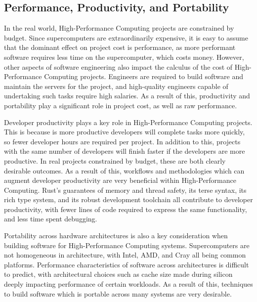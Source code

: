\subsection{Performance, Productivity, and Portability}
\label{ssec:p3hpc} %

In the real world, High-Performance Computing projects are constrained by budget. Since supercomputers are extraordinarily expensive, it is easy to assume that the dominant effect on project cost is performance, as more performant software requires less time on the supercomputer, which costs money. However, other aspects of software engineering also impact the calculus of the cost of High-Performance Computing projects. Engineers are required to build software and maintain the servers for the project, and high-quality engineers capable of undertaking such tasks require high salaries. As a result of this, productivity and portability play a significant role in project cost, as well as raw performance.

Developer productivity plays a key role in High-Performance Computing projects. This is because is more productive developers will complete tasks more quickly, so fewer developer hours are required per project. In addition to this, projects with the same number of developers will finish faster if the developers are more productive. In real projects constrained by budget, these are both clearly desirable outcomes. As a result of this, workflows and methodologies which can augment developer productivity are very beneficial within High-Performance Computing. Rust's guarantees of memory and thread safety, its terse syntax, its rich type system, and its robust development toolchain all contribute to developer productivity, with fewer lines of code required to express the same functionality, and less time spent debugging.

Portability across hardware architectures is also a key consideration when building software for High-Performance Computing systems. Supercomputers are not homogeneous in architecture, with Intel, AMD, and Cray all being common platforms. Performance characteristics of software across architectures is difficult to predict, with architectural choices such as cache size made during silicon deeply impacting performance of certain workloads. As a result of this, techniques to build software which is portable across many systems are very desirable.

